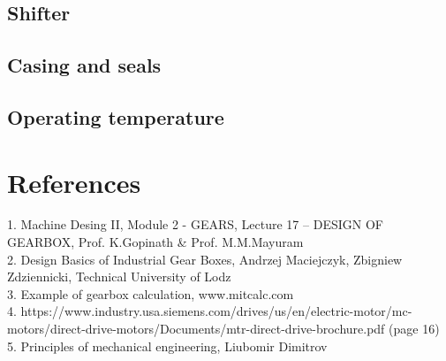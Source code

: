 \documentclass{article}
\begin{document}
\subsection{Shifter}
\subsection{Casing and seals}
\subsection{Operating temperature}

\section{References}
1. Machine Desing II, Module 2 - GEARS, Lecture 17 – DESIGN OF GEARBOX, Prof. K.Gopinath \& Prof. M.M.Mayuram \\
2. Design Basics of Industrial Gear Boxes, Andrzej Maciejczyk, Zbigniew Zdziennicki, Technical University of Lodz \\
3. Example of gearbox calculation, www.mitcalc.com \\
4. https://www.industry.usa.siemens.com/drives/us/en/electric-motor/mc-motors/direct-drive-motors/Documents/mtr-direct-drive-brochure.pdf  (page 16) \\
5. Principles of mechanical engineering, Liubomir Dimitrov

\tableofcontents
\end{document}
